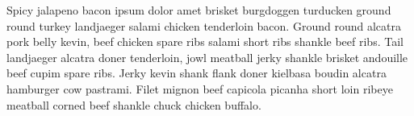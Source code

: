 % 

% 



\bigskip\noindent
Spicy jalapeno bacon ipsum dolor amet brisket burgdoggen turducken ground round turkey landjaeger salami chicken tenderloin bacon. Ground round alcatra pork belly kevin, beef chicken spare ribs salami short ribs shankle beef ribs. Tail landjaeger alcatra doner tenderloin, jowl meatball jerky shankle brisket andouille beef cupim spare ribs. Jerky kevin shank flank doner kielbasa boudin alcatra hamburger cow pastrami. Filet mignon beef capicola picanha short loin ribeye meatball corned beef shankle chuck chicken buffalo.

